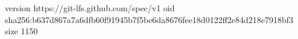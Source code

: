 version https://git-lfs.github.com/spec/v1
oid sha256:b637d867a7a6dfb60f91945b7f5be6da8676fee18d0122ff2e84d218e7918bf3
size 1150
